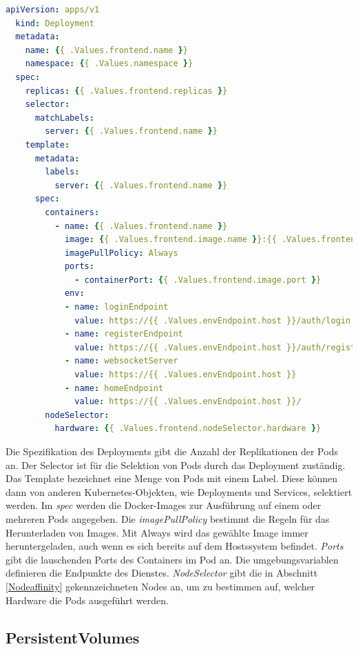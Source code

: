 \begin{lstlisting}[caption={frontend-deployment.yaml },captionpos=b,label={lst:deploymentauth},language=yaml]
  apiVersion: apps/v1
  kind: Deployment
  metadata:
    name: {{ .Values.frontend.name }}
    namespace: {{ .Values.namespace }}
  spec:
    replicas: {{ .Values.frontend.replicas }}
    selector:
      matchLabels:
        server: {{ .Values.frontend.name }}
    template:
      metadata:
        labels:
          server: {{ .Values.frontend.name }}
      spec:
        containers:
          - name: {{ .Values.frontend.name }}
            image: {{ .Values.frontend.image.name }}:{{ .Values.frontend.image.tag }}
            imagePullPolicy: Always
            ports:
              - containerPort: {{ .Values.frontend.image.port }}
            env:
            - name: loginEndpoint
              value: https://{{ .Values.envEndpoint.host }}/auth/login
            - name: registerEndpoint
              value: https://{{ .Values.envEndpoint.host }}/auth/register
            - name: websocketServer
              value: https://{{ .Values.envEndpoint.host }}
            - name: homeEndpoint
              value: https://{{ .Values.envEndpoint.host }}/
        nodeSelector:
          hardware: {{ .Values.frontend.nodeSelector.hardware }}

\end{lstlisting}

Die Spezifikation des Deployments gibt die Anzahl der Replikationen der Pods an.
Der Selector ist für die Selektion von Pods durch das Deployment zuständig.
Das Template bezeichnet eine Menge von Pods mit einem Label.
Diese können dann von anderen Kubernetes-Objekten, wie Deployments und Services, selektiert werden.
Im \textit{spec} werden die Docker-Images zur Ausführung auf einem oder mehreren Pods angegeben.
Die \textit{imagePullPolicy} bestimmt die Regeln für das Herunterladen von Images.
Mit Always wird das gewählte Image immer heruntergeladen, auch wenn es sich bereits auf dem Hostssystem befindet.
\textit{Ports} gibt die lauschenden Ports des Containers im Pod an.
Die umgebungsvariablen definieren die Endpunkte des Dienstes.
\textit{NodeSelector} gibt die in Abschnitt \ref{Nodeaffinity} gekennzeichneten Nodes an, um zu bestimmen auf, welcher Hardware die Pods ausgeführt werden.


\subsection{PersistentVolumes}


